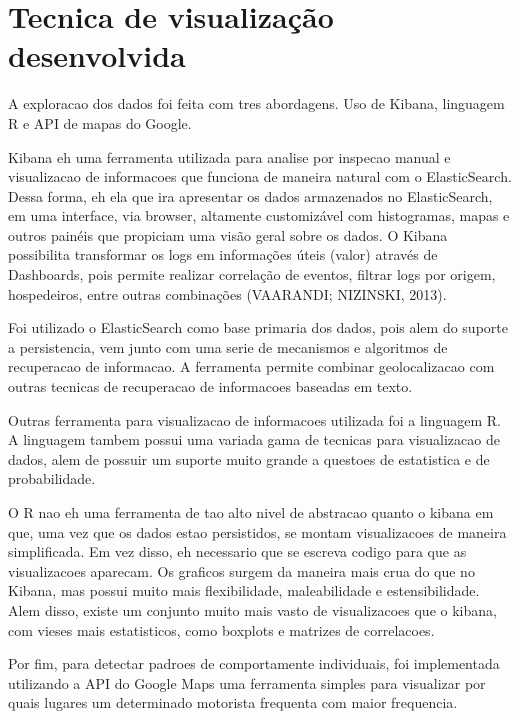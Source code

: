\documentclass[10pt, conference]{IEEEtran}
\begin{document}
\section{Tecnica de visualização desenvolvida}
\label{sec:technique}
%

A exploracao dos dados foi feita com tres abordagens. Uso de Kibana, linguagem R
e API de mapas do Google.

Kibana eh uma ferramenta utilizada para analise por inspecao manual e visualizacao
de informacoes que funciona de maneira natural com o ElasticSearch. Dessa  forma, 
eh  ela  que ira apresentar os dados armazenados no ElasticSearch, em uma interface,  via
browser, altamente customizável com histogramas, mapas e outros painéis que propiciam uma visão
geral sobre os dados.  O Kibana possibilita transformar os logs em informações úteis (valor)
através  de Dashboards,  pois  permite  realizar  correlação  de  eventos,  filtrar logs
por  origem, hospedeiros, entre outras combinações (VAARANDI; NIZINSKI, 2013).

Foi utilizado o ElasticSearch como base primaria dos dados, pois alem do suporte a persistencia,
vem junto com uma serie de mecanismos e algoritmos de recuperacao de informacao. A ferramenta
permite combinar geolocalizacao com outras tecnicas de recuperacao de informacoes baseadas
em texto.

Outras ferramenta para visualizacao de informacoes utilizada foi a linguagem R. A linguagem
tambem possui uma variada gama de tecnicas para visualizacao de dados, alem de possuir um
suporte muito grande a questoes de estatistica e de probabilidade. 

O R nao eh uma ferramenta de tao alto nivel de abstracao quanto o kibana em que, uma vez
que os dados estao persistidos, se montam visualizacoes de maneira simplificada. Em
vez disso, eh necessario
que se escreva codigo para que as visualizacoes aparecam. Os graficos surgem da maneira
mais crua do que no Kibana, mas possui muito mais flexibilidade, maleabilidade
e estensibilidade. Alem disso, existe um conjunto muito mais vasto de visualizacoes
que o kibana, com vieses mais estatisticos, como boxplots e matrizes de correlacoes.

Por fim, para detectar padroes de comportamente individuais, foi implementada utilizando
a API do Google Maps uma ferramenta simples para visualizar por quais lugares um determinado
motorista frequenta com maior frequencia.

\end{document}

